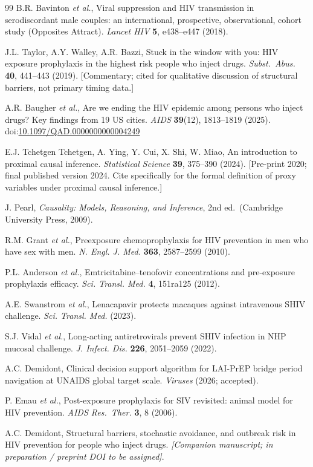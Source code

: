 \documentclass[11pt]{article}
\theoremstyle{definition}
\theoremstyle{remark}
\begin{document}
\begin{thebibliography}{99}
B.R. Bavinton \textit{et al.}, Viral suppression and HIV transmission in serodiscordant male couples: an international, prospective, observational, cohort study (Opposites Attract). \textit{Lancet HIV} \textbf{5}, e438--e447 (2018).

J.L. Taylor, A.Y. Walley, A.R. Bazzi, Stuck in the window with you: HIV exposure prophylaxis in the highest risk people who inject drugs. \textit{Subst.\ Abus.} \textbf{40}, 441--443 (2019). [Commentary; cited for qualitative discussion of structural barriers, not primary timing data.]

A.R. Baugher \textit{et al.}, Are we ending the HIV epidemic among persons who inject drugs? Key findings from 19 US cities. \textit{AIDS} \textbf{39}(12), 1813--1819 (2025). doi:\href{https://doi.org/10.1097/QAD.0000000000004249}{10.1097/QAD.0000000000004249}

E.J. Tchetgen Tchetgen, A. Ying, Y. Cui, X. Shi, W. Miao, An introduction to proximal causal inference. \textit{Statistical Science} \textbf{39}, 375--390 (2024). [Pre-print 2020; final published version 2024. Cite specifically for the formal definition of proxy variables under proximal causal inference.]

J. Pearl, \textit{Causality: Models, Reasoning, and Inference}, 2nd ed.\ (Cambridge University Press, 2009).

R.M. Grant \textit{et al.}, Preexposure chemoprophylaxis for HIV prevention in men who have sex with men. \textit{N. Engl. J. Med.} \textbf{363}, 2587--2599 (2010).

P.L. Anderson \textit{et al.}, Emtricitabine--tenofovir concentrations and pre-exposure prophylaxis efficacy. \textit{Sci. Transl. Med.} \textbf{4}, 151ra125 (2012).

A.E. Swanstrom \textit{et al.}, Lenacapavir protects macaques against intravenous SHIV challenge. \textit{Sci. Transl. Med.} (2023).

S.J. Vidal \textit{et al.}, Long-acting antiretrovirals prevent SHIV infection in NHP mucosal challenge. \textit{J. Infect. Dis.} \textbf{226}, 2051--2059 (2022).

A.C. Demidont, Clinical decision support algorithm for LAI-PrEP bridge period navigation at UNAIDS global target scale. \textit{Viruses} (2026; accepted).

P. Emau \textit{et al.}, Post-exposure prophylaxis for SIV revisited: animal model for HIV prevention. \textit{AIDS Res.\ Ther.} \textbf{3}, 8 (2006).

A.C. Demidont, Structural barriers, stochastic avoidance, and outbreak risk in HIV prevention for people who inject drugs. \textit{[Companion manuscript; in preparation / preprint DOI to be assigned]}.

\end{thebibliography}
\end{document}
